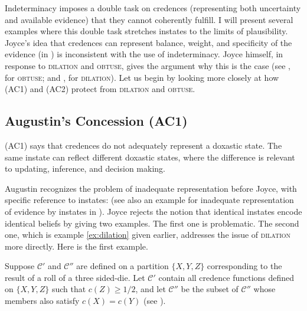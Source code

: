 \documentclass[phd,12pt,oneside]{ubcthesis}
\begin{document}
Indeterminacy imposes a double task on credences (representing both
uncertainty and available evidence) that they cannot coherently
fulfill. I will present several examples where this double task
stretches instates to the limits of plausibility. Joyce's idea that
credences can represent balance, weight, and specificity of the
evidence (in ) is inconsistent with the use of
indeterminacy. Joyce himself, in response to \textsc{dilation} and
\textsc{obtuse}, gives the argument why this is the case (see
, for \textsc{obtuse}; and
, for \textsc{dilation}). Let us
begin by looking more closely at how (AC1) and (AC2) protect
{\augustin} from \textsc{dilation} and \textsc{obtuse}.

\subsection{Augustin's Concession (AC1)}
\label{subsec:phahngot}

(AC1) says that credences do not adequately represent a doxastic
state. The same instate can reflect different doxastic states, where
the difference is relevant to updating, inference, and decision
making.

Augustin recognizes the problem of inadequate representation before
Joyce, with specific reference to instates:   (see also an example for
inadequate representation of evidence by instates in
). Joyce rejects the notion that
identical instates encode identical beliefs by giving two examples.
The first one is problematic. The second one, which is example
\ref{ex:dilation} given earlier, addresses the issue of
\textsc{dilation} more directly. Here is the first example.

\begin{quotex}
  \label{ex:die} Suppose $\mathcal{C}'$ and
  $\mathcal{C}''$ are defined on a partition $\{X,Y,Z\}$ corresponding
  to the result of a roll of a three sided-die. Let $\mathcal{C}'$
  contain all credence functions defined on $\{X,Y,Z\}$ such that
  $c(Z)\geq1/2$, and let $\mathcal{C}''$ be the subset of
  $\mathcal{C}''$ whose members also satisfy $c(X)=c(Y)$ (see
  ).
\end{quotex}
\end{document}
